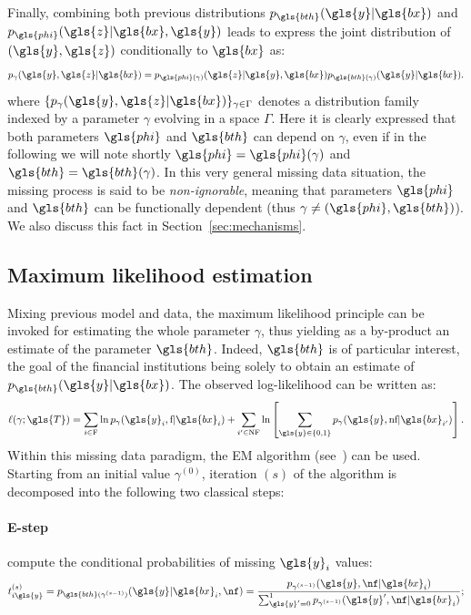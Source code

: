 Finally, combining both previous distributions $p_{\gls{bth}}(\gls{y}|\gls{bx})$ and $p_{\gls{phi}}(\gls{z}|\gls{bx},\gls{y})$ leads to express the joint distribution of $(\gls{y},\gls{z})$ conditionally to $\gls{bx}$ as:
\begin{equation}\label{eq:generative}
p_{\gamma}(\gls{y},\gls{z}|\gls{bx}) = p_{\gls{phi}(\gamma)}(\gls{z}|\gls{y},\gls{bx})p_{\gls{bth}(\gamma)}(\gls{y}|\gls{bx}).
\end{equation}
where $\{p_{\gamma}(\gls{y},\gls{z}|\gls{bx})\}_{\gamma \in \Gamma}$ denotes a distribution family indexed by a parameter $\gamma$ evolving in a space $\Gamma$. Here it is clearly expressed that both parameters $\gls{phi}$ and $\gls{bth}$ can depend on $\gamma$, even if in the following we will note shortly $\gls{phi}=\gls{phi}(\gamma)$ and $\gls{bth}=\gls{bth}(\gamma)$. In this very general missing data situation, the missing process is said to be {\it non-ignorable}, meaning that parameters $\gls{phi}$ and $\gls{bth}$ can be functionally dependent (thus $\gamma\neq (\gls{phi},\gls{bth})$). We also discuss this fact in Section~\ref{sec:mechanisms}.

\subsection{Maximum likelihood estimation} 
\label{sec:EM}

Mixing previous model and data, the maximum likelihood principle can be invoked for estimating the whole parameter $\gamma$, thus yielding as a by-product an estimate of the parameter $\gls{bth}$. Indeed, $\gls{bth}$ is of particular interest, the goal of the financial institutions being solely to obtain an estimate of $p_{\gls{bth}}(\gls{y}|\gls{bx})$. The observed log-likelihood can be written as:
\begin{equation}\label{eq:like.MNAR}
\ell(\gamma;\gls{T}) = \sum_{i\in\text{F}}\ln p_{\gamma}(\gls{y}_i,\text{f} | \gls{bx}_i) + \sum_{i'\in\text{NF}} \ln \left[ \sum_{\gls{y}\in\{0,1\}} p_{\gamma}(\gls{y},\text{nf} | \gls{bx}_{i'}) \right].
\end{equation}
Within this missing data paradigm, the EM algorithm (see~\cite{dempster1977maximum}) can be used. Starting from an initial value $\gamma^{(0)}$, iteration $(s)$ of the algorithm is decomposed into the following two classical steps:
\paragraph{E-step} compute the conditional probabilities of missing $\gls{y}_i$ values:
\begin{equation}
t_{i\gls{y}}^{(s)} = p_{\gls{bth}(\gamma^{(s-1)})}(\gls{y}|\gls{bx}_i,\nf) = \frac{p_{\gamma^{(s-1)}}(\gls{y}, \nf|\gls{bx}_i)}{\sum_{\gls{y}' = 0}^{1} p_{\gamma^{(s-1)}}(\gls{y}', \nf|\gls{bx}_i)};
\end{equation}

